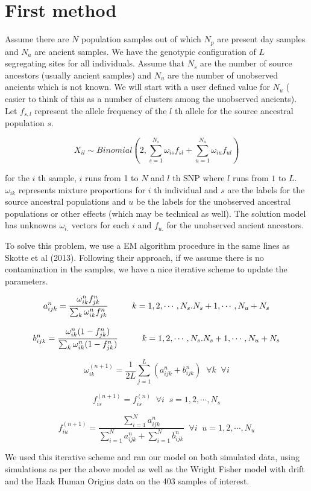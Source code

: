 \documentclass[11pt]{article}
\begin{document}
\section{First method}

Assume there are $N$ population samples out of which $N_p$ are present day samples and $N_a$ are ancient samples. We have the genotypic configuration of $L$ segregating sites for all individuals.  Assume that $N_s$ are the number of source ancestors (usually ancient samples) and $N_u$ are the number of unobserved ancients which is not known. We will start with a user defined value for $N_u$ ( easier to think of this as a number of clusters among the unobserved ancients). Let $f_{s,l}$ represent the allele frequency of the $l$ th allele for the source ancestral population $s$.

$$ X_{il} \sim Binomial (2, \sum_{s=1}^{N_s} \omega_{is} f_{sl} + \sum_{u=1}^{N_u} \omega_{iu} f_{ul}) $$

for the $i$ th sample, $i$ runs from 1 to $N$ and $l$ th SNP  where $l$ runs from $1$ to $L$. $\omega_{ik}$ represents mixture proportions for $i$ th individual and $s$ are the labels for the source ancestral populations  and $u$  be the labels for the unobserved ancestral populations or other effects (which may be technical as well).  The solution model has unknowns $\omega_{i.}$ vectors for each $i$ and $f_{u.}$ for the unobserved ancient ancestors. 

To solve this problem, we use a EM algorithm procedure in the same lines as Skotte et al (2013).  Following their approach, if we assume there is no contamination in the samples, we have a nice iterative scheme to update the parameters. 

$$ a^{n}_{ijk} = \frac{\omega^{n}_{ik} f^{n}_{jk}}{\sum_k \omega^{n}_{ik} f^{n}_{jk}}  \hspace{1 cm} k=1,2,\cdots, N_s. N_s +1, \cdots, N_u+N_s $$

$$ b^{n}_{ijk} = \frac{\omega^{n}_{ik} (1-f^{n}_{jk})}{\sum_k \omega^{n}_{ik} (1-f^{n}_{jk})}  \hspace{1 cm} k=1,2,\cdots, N_s. N_s +1, \cdots, N_u+N_s $$

$$ \omega^{(n+1)}_{ik} = \frac{1}{2L} \sum_{j=1}^{L} ( a^{n}_{ijk} +  b^{n}_{ijk})  \;\; \forall k  \;\; \forall i$$

$$ f^{(n+1)}_{is} = f^{(n)}_{is}  \;\; \forall i  \;\; s=1,2, \cdots, N_s $$

$$ f^{(n+1)}_{iu} = \frac{\sum_{i=1}^{N} a^{n}_{ijk}}{\sum_{i=1}^{N} a^{n}_{ijk} + \sum_{i=1}^{N} b^{n}_{ijk}} \;\; \forall i  \;\; u=1,2, \cdots, N_u $$

We used this iterative scheme and ran our model on both simulated data, using simulations as per the above model as well as the Wright Fisher model with drift and the Haak Human Origins data on the 403 samples of interest. 
\end{document}
